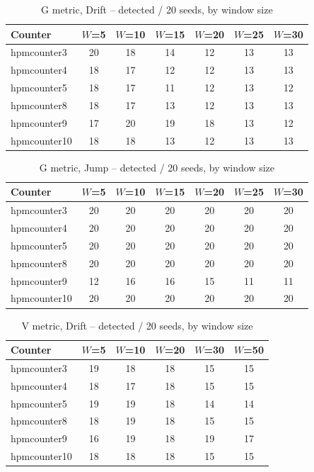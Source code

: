 \begin{table}[t]
\centering
\caption{G metric, Drift -- detected / 20 seeds, by window size}
\label{tab:window-sweep-g-drift}
\begin{tabular}{@{}lcccccc@{}}
\toprule
Counter & $W$=5 & $W$=10 & $W$=15 & $W$=20 & $W$=25 & $W$=30 \\
\midrule
hpmcounter3  & 20 & 18 & 14 & 12 & 13 & 13 \\
hpmcounter4  & 18 & 17 & 12 & 12 & 13 & 13 \\
hpmcounter5  & 18 & 17 & 11 & 12 & 13 & 12 \\
hpmcounter8  & 18 & 17 & 13 & 12 & 13 & 13 \\
hpmcounter9  & 17 & 20 & 19 & 18 & 13 & 12 \\
hpmcounter10 & 18 & 18 & 13 & 12 & 13 & 13 \\
\bottomrule
\end{tabular}
\end{table}

\begin{table}[t]
\centering
\caption{G metric, Jump -- detected / 20 seeds, by window size}
\label{tab:window-sweep-g-jump}
\begin{tabular}{@{}lcccccc@{}}
\toprule
Counter & $W$=5 & $W$=10 & $W$=15 & $W$=20 & $W$=25 & $W$=30 \\
\midrule
hpmcounter3  & 20 & 20 & 20 & 20 & 20 & 20 \\
hpmcounter4  & 20 & 20 & 20 & 20 & 20 & 20 \\
hpmcounter5  & 20 & 20 & 20 & 20 & 20 & 20 \\
hpmcounter8  & 20 & 20 & 20 & 20 & 20 & 20 \\
hpmcounter9  & 12 & 16 & 16 & 15 & 11 & 11 \\
hpmcounter10 & 20 & 20 & 20 & 20 & 20 & 20 \\
\bottomrule
\end{tabular}
\end{table}

\begin{table}[t]
\centering
\caption{V metric, Drift -- detected / 20 seeds, by window size}
\label{tab:window-sweep-v-drift}
\begin{tabular}{@{}lccccc@{}}
\toprule
Counter & $W$=5 & $W$=10 & $W$=20 & $W$=30 & $W$=50 \\
\midrule
hpmcounter3  & 19 & 18 & 18 & 15 & 15 \\
hpmcounter4  & 18 & 17 & 18 & 15 & 15 \\
hpmcounter5  & 19 & 19 & 18 & 14 & 14 \\
hpmcounter8  & 18 & 19 & 18 & 15 & 15 \\
hpmcounter9  & 16 & 19 & 18 & 19 & 17 \\
hpmcounter10 & 18 & 18 & 18 & 15 & 15 \\
\bottomrule
\end{tabular}
\end{table}

